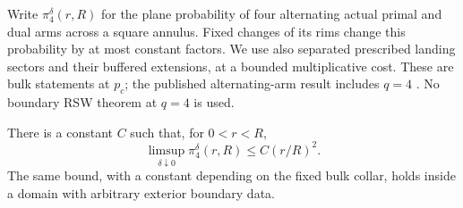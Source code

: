 Write $\pi_4^\delta(r,R)$ for the plane probability of four alternating
actual primal and dual arms across a square annulus.  Fixed changes of
its rims change this probability by at most constant factors.  We use
also separated prescribed landing sectors and their buffered
extensions, at a bounded multiplicative cost.  These are bulk
statements at $p_c$; the published alternating-arm result includes
$q=4$ \citep[Proposition~2.3 and the arm-separation discussion]{DM2022Scaling}.
No boundary RSW theorem at $q=4$ is used.

\begin{proposition}\label{q4field:four-arm}
There is a constant $C$ such
that, for $0<r<R$,
\begin{equation}\label{q4field:four-arm-bound}
 \limsup_{\delta\downarrow0}\pi_4^\delta(r,R)
 \le C(r/R)^2.
\end{equation}
The same bound, with a constant depending on the fixed bulk collar,
holds inside a domain with arbitrary exterior boundary data.
\end{proposition}

